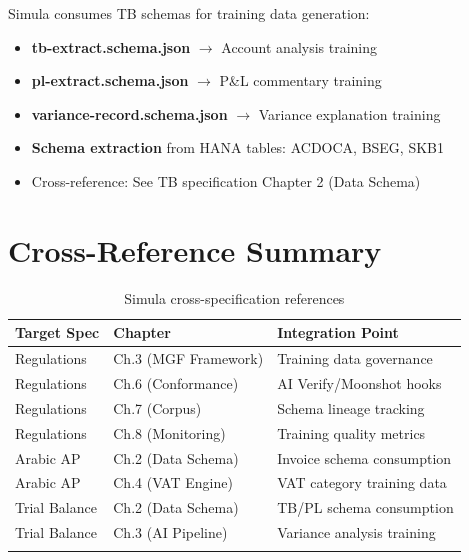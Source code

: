 Simula consumes TB schemas for training data generation:

\begin{itemize}
  \item \textbf{tb-extract.schema.json} $\rightarrow$ Account analysis training
  \item \textbf{pl-extract.schema.json} $\rightarrow$ P\&L commentary training
  \item \textbf{variance-record.schema.json} $\rightarrow$ Variance explanation training
  \item \textbf{Schema extraction} from HANA tables: ACDOCA, BSEG, SKB1
  \item Cross-reference: See TB specification Chapter 2 (Data Schema)
\end{itemize}

\section{Cross-Reference Summary}
\label{sec:xref-summary}

\begin{longtable}{@{}p{3.5cm}p{4cm}p{5cm}@{}}
\toprule
\textbf{Target Spec} & \textbf{Chapter} & \textbf{Integration Point} \\
\midrule
\endhead
Regulations & Ch.3 (MGF Framework) & Training data governance \\
Regulations & Ch.6 (Conformance) & AI Verify/Moonshot hooks \\
Regulations & Ch.7 (Corpus) & Schema lineage tracking \\
Regulations & Ch.8 (Monitoring) & Training quality metrics \\
\midrule
Arabic AP & Ch.2 (Data Schema) & Invoice schema consumption \\
Arabic AP & Ch.4 (VAT Engine) & VAT category training data \\
\midrule
Trial Balance & Ch.2 (Data Schema) & TB/PL schema consumption \\
Trial Balance & Ch.3 (AI Pipeline) & Variance analysis training \\
\bottomrule
\caption{Simula cross-specification references}
\end{longtable}